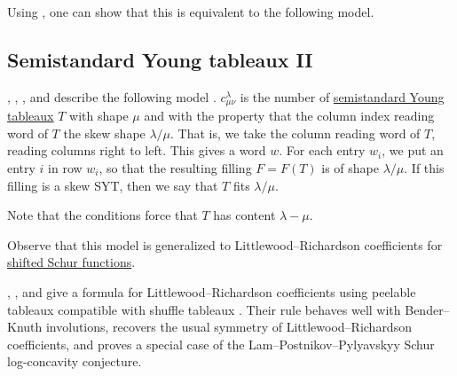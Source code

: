 Using \cite[Rem.~14 and Cor.~21]{KaliszewskiMorse2019}, one can show that
this is equivalent to the following model.


\subsection[lrMolevSagan]{Semistandard Young tableaux II}

, , , and
 describe the following model
\cite{FominGreene1993,MolevSagan1999}.
$c^{\lambda}_{\mu\nu}$ is the number of
\hyperref[prelimTableaux]{semistandard Young tableaux} $T$ with shape $\mu$
and with the property that the column index reading word of $T$
\label{lrFitsSkewShape} the skew shape $\lambda/\mu$.
That is, we take the column reading word of $T$, reading columns right to left.
This gives a word $w$. For each entry $w_i$, we put an entry $i$ in row $w_i$,
so that the resulting filling $F=F(T)$ is of shape $\lambda/\mu$.
If this filling is a skew SYT, then we say that $T$ fits $\lambda/\mu$.

Note that the conditions force that $T$ has content $\lambda-\mu$.

Observe that this model is generalized to Littlewood--Richardson coefficients for
\hyperref[schurShifted]{shifted Schur functions}.

, , and  give a
formula for Littlewood--Richardson coefficients using peelable tableaux
compatible with shuffle tableaux \cite{NguyenNguyenWoodruff2025x}.  Their
rule behaves well with Bender--Knuth involutions, recovers the usual symmetry
of Littlewood--Richardson coefficients, and proves a special case of the
Lam--Postnikov--Pylyavskyy Schur log-concavity conjecture.


